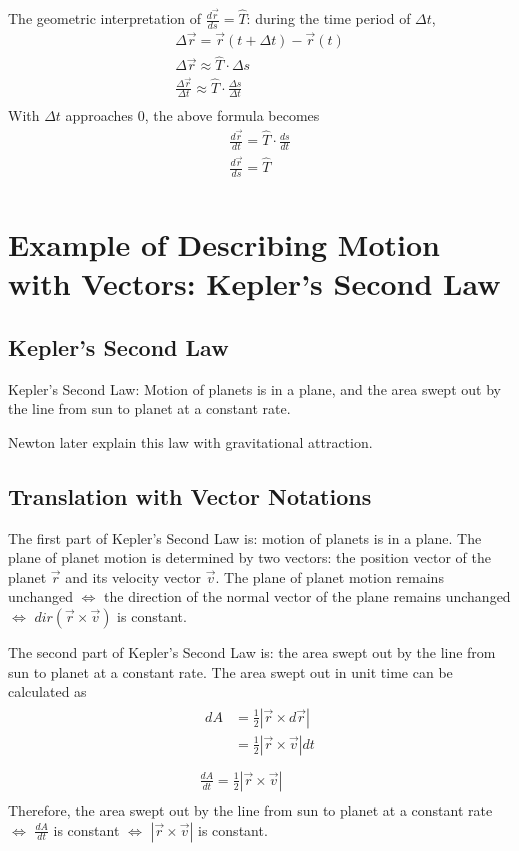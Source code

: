 \documentclass{article}
\begin{document}
The geometric interpretation of $\frac{d\vec{r}}{ds} = \hat{T}$: during the time 
period of $\Delta t$, 
\begin{gather*}
  \Delta \vec{r} = \vec{r}(t + \Delta t) - \vec{r}(t) \\
  \Delta \vec{r} \approx \hat{T} \cdot \Delta s \\
  \frac{\Delta \vec{r}}{\Delta t} \approx \hat{T} \cdot \frac{\Delta s}{\Delta t} \\
\end{gather*}
With $\Delta t$ approaches 0, the above formula becomes
\begin{gather*}
  \frac{d\vec{r}}{dt} = \hat{T} \cdot \frac{ds}{dt} \\
  \frac{d\vec{r}}{ds} = \hat{T} \\
\end{gather*}

\section{Example of Describing Motion with Vectors: Kepler's Second Law}

\subsection{Kepler's Second Law}

Kepler's Second Law: Motion of planets is in a plane, and the area swept out by 
the line from sun to planet at a constant rate.

Newton later explain this law with gravitational attraction.

\subsection{Translation with Vector Notations}

The first part of Kepler's Second Law is: motion of planets is in a plane. The 
plane of planet motion is determined by two vectors: the position vector of the 
planet $\vec{r}$ and its velocity vector $\vec{v}$. The plane of planet motion 
remains unchanged $\iff$ the direction of the normal vector of the plane remains
unchanged $\iff$ $dir(\vec{r} \times \vec{v})$ is constant.

The second part of Kepler's Second Law is: the area swept out by the line from 
sun to planet at a constant rate. The area swept out in unit time can be 
calculated as
\begin{gather*}
  \begin{split}
    dA &= \frac{1}{2}|\vec{r} \times d\vec{r}| \\
       &= \frac{1}{2}|\vec{r} \times \vec{v}| dt \\
  \end{split} \\
  \frac{dA}{dt} = \frac{1}{2}|\vec{r} \times \vec{v}| \\
\end{gather*}
Therefore, the area swept out by the line from sun to planet at a constant rate 
$\iff$ $\frac{dA}{dt}$ is constant $\iff$ $|\vec{r} \times \vec{v}|$ is constant.
\end{document}
